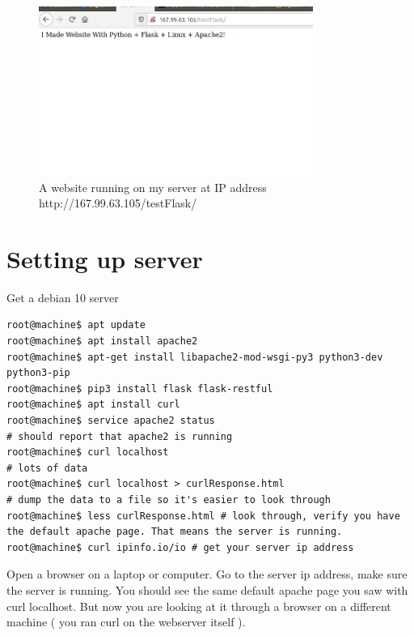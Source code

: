 \documentclass[10pt]{article}
\begin{document}
\begin{figure}[h]
  \centering
    \includegraphics[width=0.8\textwidth]{Exercise1Success.png}
  \caption{A website running on my server at IP address http://167.99.63.105/testFlask/}
\end{figure}



\section{Setting up server}
Get a debian 10 server

\begin{lstlisting}
root@machine$ apt update
root@machine$ apt install apache2
root@machine$ apt-get install libapache2-mod-wsgi-py3 python3-dev python3-pip
root@machine$ pip3 install flask flask-restful
root@machine$ apt install curl
root@machine$ service apache2 status
# should report that apache2 is running
root@machine$ curl localhost
# lots of data
root@machine$ curl localhost > curlResponse.html
# dump the data to a file so it's easier to look through
root@machine$ less curlResponse.html # look through, verify you have the default apache page. That means the server is running.
root@machine$ curl ipinfo.io/io # get your server ip address
\end{lstlisting}

Open a browser on a laptop or computer. Go to the server ip address, make sure the server is running. You should see the same default apache page you saw with curl localhost. But now you are looking at it through a browser on a different machine ( you ran curl on the webserver itself ).
\end{document}
